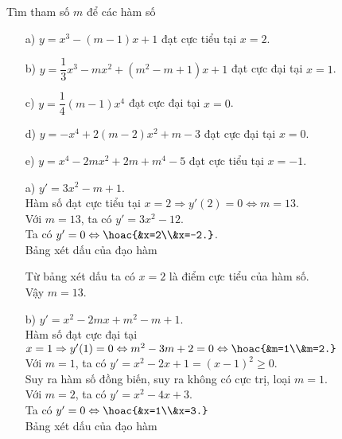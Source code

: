 \begin{vd}%
	Tìm tham số $m$ để các hàm số
	\begin{enumerate}
		\item[a)] $y=x^3-(m-1)x+1$ đạt cực tiểu tại $x=2$.
		\item[b)] $y=\dfrac{1}{3}x^3-mx^2+\left(m^2-m+1\right)x+1$ đạt cực đại tại $x=1$.
		\item[c)] $y=\dfrac{1}{4}(m-1)x^4$ đạt cực đại tại $x=0$.
		\item[d)] $y=-x^4+2(m-2)x^2+m-3$ đạt cực đại tại $x=0$.
		\item[e)] $y=x^4-2mx^2+2m+m^4-5$ đạt cực tiểu tại $x=-1$.
	\end{enumerate}
\loigiai
{
\begin{enumerate}
\item[a)] $y'=3x^2-m+1$. \\
Hàm số đạt cực tiểu tại $x=2\Rightarrow y'(2)=0 \Leftrightarrow m=13$. \\
Với $m=13$, ta có $y'=3x^2-12$. \\
Ta có $y'=0\Leftrightarrow\hoac{&x=2\\&x=-2.}$.\\
Bảng xét dấu của đạo hàm
\begin{center}
\end{center}
Từ bảng xét dấu ta có $x=2$ là điểm cực tiểu của hàm số.\\
Vậy $m=13$.
\item[b)] $y'=x^2-2mx+m^2-m+1$. \\
Hàm số đạt cực đại tại $x=1\Rightarrow y'(1)=0\Leftrightarrow m^2-3m+2=0\Leftrightarrow\hoac{&m=1\\&m=2.}$\\
Với $m=1$, ta có $y'=x^2-2x+1=\left(x-1\right)^2\geq0$. \\
Suy ra hàm số đồng biến, suy ra không có cực trị, loại $m=1$. \\
Với $m=2$, ta có $y'=x^2-4x+3$. \\
Ta có $y'=0\Leftrightarrow\hoac{&x=1\\&x=3.}$\\
Bảng xét dấu của đạo hàm
\begin{center}
\begin{tikzpicture}[scale=1]

\end{tikzpicture}
\end{center}
\end{enumerate}}
\end{vd}
